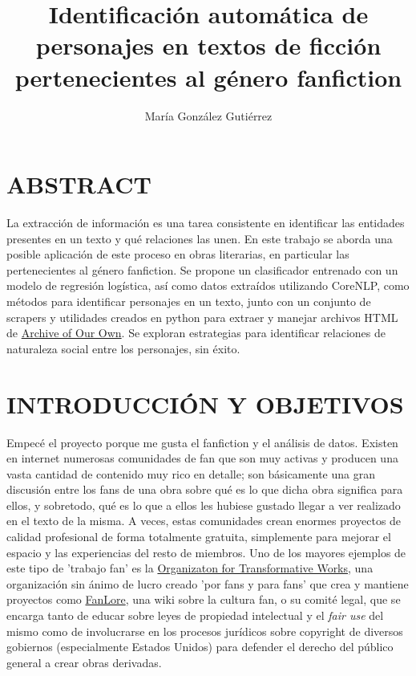 \documentclass{pre-tfg}
\title{Identificación automática de personajes en textos de ficción pertenecientes al género fanfiction}
\author{María González Gutiérrez}
\begin{document}
\maketitle
\tableofcontents

\cleardoublepage

\clearpage

\cleardoublepage
\section{ABSTRACT}
La extracción de información es una tarea consistente en identificar las entidades presentes en un texto y qué relaciones las unen. En este trabajo se aborda una posible aplicación de este proceso en obras literarias, en particular las pertenecientes al género fanfiction. Se propone un clasificador entrenado con un modelo de regresión logística, así como datos extraídos utilizando CoreNLP, como métodos para identificar personajes en un texto, junto con un conjunto de scrapers y utilidades creados en python para extraer y manejar archivos HTML de \href{http://www.archiveofourown.org}{Archive of Our Own}. Se exploran estrategias para identificar relaciones de naturaleza social entre los personajes, sin éxito.

\cleardoublepage
\section{INTRODUCCIÓN Y OBJETIVOS}

Empecé el proyecto porque me gusta el fanfiction y el análisis de datos. Existen en internet numerosas comunidades de fan que son muy activas y producen una vasta cantidad de contenido muy rico en detalle; son básicamente una gran discusión entre los fans de una obra sobre qué es lo que dicha obra significa para ellos, y sobretodo, qué es lo que a ellos les hubiese gustado llegar a ver realizado en el texto de la misma. A veces, estas comunidades crean enormes proyectos de calidad profesional de forma totalmente gratuita, simplemente para mejorar el espacio y las experiencias del resto de miembros. Uno de los mayores ejemplos de este tipo de 'trabajo fan' es la \href{https://www.transformativeworks.org/}{Organizaton for Transformative Works}, una organización sin ánimo de lucro creado 'por fans y para fans' que crea y mantiene proyectos como \href{https://www.fanlore.org/wiki/Main_Page}{FanLore}, una wiki sobre la cultura fan, o su comité legal, que se encarga tanto de educar sobre leyes de propiedad intelectual y el \textit{fair use} del mismo como de involucrarse en los procesos jurídicos sobre copyright de diversos gobiernos (especialmente Estados Unidos) para defender el derecho del público general a crear obras derivadas.
\end{document}

